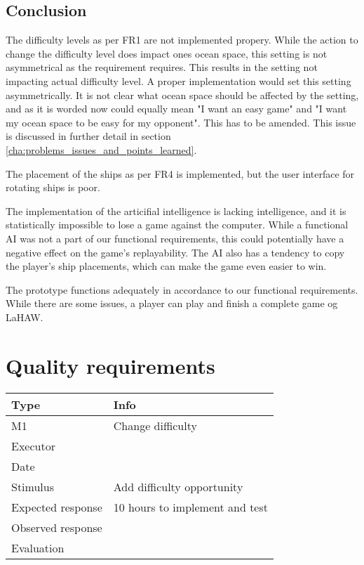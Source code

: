 \vspace{0.5em}


	\subsection{Conclusion}
	The difficulty levels as per FR1 are not implemented propery. While the action to change the difficulty level does impact ones ocean space, this setting is not asymmetrical as the requirement requires. This results in the setting not impacting actual difficulty level. A proper implementation would set this setting asymmetrically.
	It is not clear what ocean space should be affected by the setting, and as it is worded now could equally mean "I want an easy game" and "I want my ocean space to be easy for my opponent". This has to be amended. This issue is discussed in further detail in section \ref{cha:problems_issues_and_points_learned}.

	The placement of the ships as per FR4 is implemented, but the user interface for rotating ships is poor.

	The implementation of the articifial intelligence is lacking intelligence, and it is statistically impossible to lose a game against the computer. While a functional AI was not a part of our functional requirements, this could potentially have a negative effect on the game's replayability. The AI also has a tendency to copy the player's ship placements, which can make the game even easier to win.

	The prototype functions adequately in accordance to our functional requirements. While there are some issues, a player can play and finish a complete game og LaHAW.



\section{Quality requirements}
\noindent
\begin{tabular}{|p{3cm}|p{8.5cm}|}
	\hline
	\bf{Type}	& \bf{Info} \\
	\hline
	M1			& Change difficulty \\
	Executor	&  \\
	Date		& \date{\today} \\
	Stimulus	& Add difficulty opportunity \\
	Expected response & 10 hours to implement and test \\
	Observed response & \\
	Evaluation	& \\
	\hline
\end{tabular}

